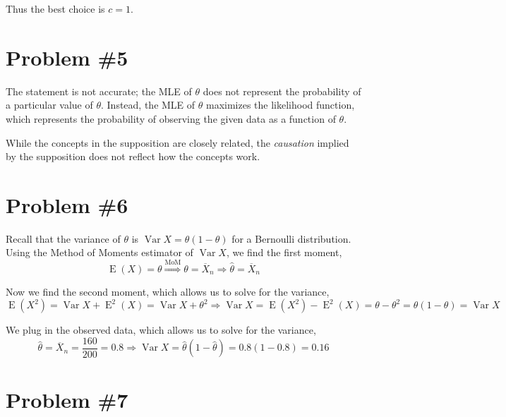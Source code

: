 \documentclass{article}
\begin{document}
Thus the best choice is $c = 1$.

\section*{Problem \#5}

The statement is not accurate; the MLE of $\theta$ does not represent the probability of a particular value of $\theta$.
Instead, the MLE of $\theta$ maximizes the likelihood function, which represents the probability of observing the given data as a function of $\theta$.

While the concepts in the supposition are closely related, the \textit{causation} implied by the supposition does not reflect how the concepts work.

\section*{Problem \#6}

Recall that the variance of $\theta$ is $\operatorname{Var}X = \theta(1 - \theta)$ for a Bernoulli distribution.
Using the Method of Moments estimator of $\operatorname{Var}X$, we find the first moment,
\[
    \operatorname{E}(X) = \theta \overset{\text{MoM}}{\Longrightarrow} \theta = \overline{X}_n \Longrightarrow \hat{\theta} = \overline{X}_n
\]

Now we find the second moment, which allows us to solve for the variance,
\[
    \operatorname{E}(X^2) = \operatorname{Var}X + \operatorname{E}^2(X) = \operatorname{Var}X + \theta^2 \Longrightarrow \operatorname{Var}X = \operatorname{E}(X^2) - \operatorname{E}^2(X) = \theta - \theta^2 = \boxed{\theta(1 - \theta) = \operatorname{Var}X}
\]

We plug in the observed data, which allows us to solve for the variance,
\[
    \hat{\theta} = \overline{X}_n = \frac{160}{200} = 0.8 \Longrightarrow \operatorname{Var}X = \hat{\theta}(1 - \hat{\theta}) = 0.8(1 - 0.8) = \boxed{0.16}
\]

\section*{Problem \#7}

\end{document}
